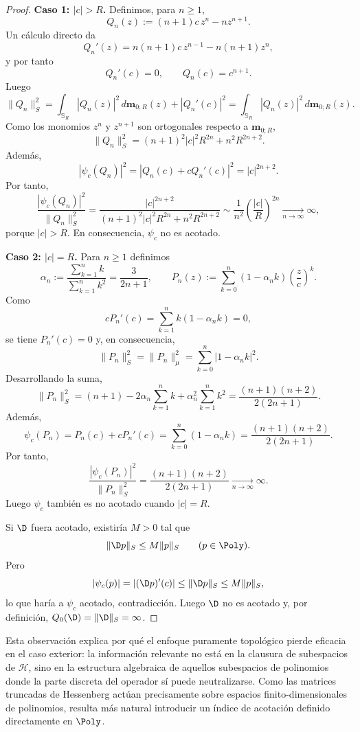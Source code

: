 \begin{proof}
	\textbf{Caso 1: $|c|>R$.}
	Definimos, para $n\ge 1$,
	\[
		Q_n(z):=(n+1)c\,z^n-nz^{n+1}.
	\]
	Un cálculo directo da
	\[
		Q_n'(z)=n(n+1)c\,z^{n-1}-n(n+1)z^n,
	\]
	y por tanto
	\[
		Q_n'(c)=0,
		\qquad
		Q_n(c)=c^{n+1}.
	\]
	Luego
	\[
		\|Q_n\|_S^2
		=
		\int_{\mathbb{S}_R}|Q_n(z)|^2\,d\mathbf m_{0;R}(z)
		+
		|Q_n'(c)|^2
		=
		\int_{\mathbb{S}_R}|Q_n(z)|^2\,d\mathbf m_{0;R}(z).
	\]
	Como los monomios $z^n$ y $z^{n+1}$ son ortogonales respecto a $\mathbf m_{0;R}$,
	\[
		\|Q_n\|_S^2
		=
		(n+1)^2|c|^2R^{2n}+n^2R^{2n+2}.
	\]
	Además,
	\[
		|\psi_c(Q_n)|^2
		=
		|Q_n(c)+cQ_n'(c)|^2
		=
		|c|^{2n+2}.
	\]
	Por tanto,
	\[
		\frac{|\psi_c(Q_n)|^2}{\|Q_n\|_S^2}
		=
		\frac{|c|^{2n+2}}{(n+1)^2|c|^2R^{2n}+n^2R^{2n+2}}
		\sim
		\frac{1}{n^2}\left(\frac{|c|}{R}\right)^{2n}
		\xrightarrow[n\to\infty]{}\infty,
	\]
	porque $|c|>R$. En consecuencia, $\psi_c$ no es acotado.

	\textbf{Caso 2: $|c|=R$.}
	Para $n\ge1$ definimos
	\[
		\alpha_n:=\frac{\sum_{k=1}^{n}k}{\sum_{k=1}^{n}k^2}=\frac{3}{2n+1},
		\qquad
		P_n(z):=\sum_{k=0}^{n}(1-\alpha_n k)\left(\frac{z}{c}\right)^k.
	\]
	Como
	\[
		cP_n'(c)=\sum_{k=1}^{n}k(1-\alpha_n k)=0,
	\]
	se tiene $P_n'(c)=0$ y, en consecuencia,
	\[
		\|P_n\|_S^2=\|P_n\|_{\mu}^2=
		\sum_{k=0}^{n}|1-\alpha_n k|^2.
	\]
	Desarrollando la suma,
	\[
		\|P_n\|_S^2
		=(n+1)-2\alpha_n\sum_{k=1}^{n}k+\alpha_n^2\sum_{k=1}^{n}k^2
		=\frac{(n+1)(n+2)}{2(2n+1)}.
	\]
	Además,
	\[
		\psi_c(P_n)=P_n(c)+cP_n'(c)=\sum_{k=0}^{n}(1-\alpha_n k)
		=\frac{(n+1)(n+2)}{2(2n+1)}.
	\]
	Por tanto,
	\[
		\frac{|\psi_c(P_n)|^2}{\|P_n\|_S^2}
		=
		\frac{(n+1)(n+2)}{2(2n+1)}
		\xrightarrow[n\to\infty]{}\infty.
	\]
	Luego $\psi_c$ también es no acotado cuando $|c|=R$.

	Si $\D$ fuera acotado, existiría $M>0$ tal que
	\[
		\|\D p\|_S\le M\|p\|_S
		\qquad (p\in\Poly).
	\]
	Pero
	\[
		|\psi_c(p)|
		=
		|(\D p)'(c)|
		\le
		\|\D p\|_S
		\le
		M\|p\|_S,
	\]
	lo que haría a $\psi_c$ acotado, contradicción. Luego $\D$ no es acotado y, por definición, $Q_0(\D)=\|\D\|_S=\infty$.
\end{proof}

Esta observación explica por qué el enfoque puramente topológico pierde eficacia en el caso exterior: la información relevante no está en la clausura de subespacios de $\mathcal{H}$, sino en la estructura algebraica de aquellos subespacios de polinomios donde la parte discreta del operador sí puede neutralizarse. Como las matrices truncadas de Hessenberg actúan precisamente sobre espacios finito-dimensionales de polinomios, resulta más natural introducir un índice de acotación definido directamente en $\Poly$.

